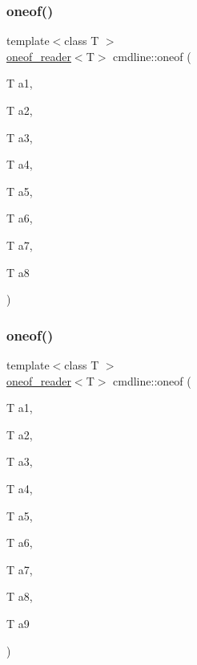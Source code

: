 \subsubsection{\texorpdfstring{oneof()}{oneof()}\hspace{0.1cm}{\footnotesize\ttfamily [8/10]}}
{\footnotesize\ttfamily template$<$class T $>$ \\
\mbox{\hyperlink{structcmdline_1_1oneof__reader}{oneof\+\_\+reader}}$<$T$>$ cmdline\+::oneof (\begin{DoxyParamCaption}\item[{T}]{a1,  }\item[{T}]{a2,  }\item[{T}]{a3,  }\item[{T}]{a4,  }\item[{T}]{a5,  }\item[{T}]{a6,  }\item[{T}]{a7,  }\item[{T}]{a8 }\end{DoxyParamCaption})}

\mbox{\label{namespacecmdline_ad4667b21857606deef99cb73dc190130}} 
\subsubsection{\texorpdfstring{oneof()}{oneof()}\hspace{0.1cm}{\footnotesize\ttfamily [9/10]}}
{\footnotesize\ttfamily template$<$class T $>$ \\
\mbox{\hyperlink{structcmdline_1_1oneof__reader}{oneof\+\_\+reader}}$<$T$>$ cmdline\+::oneof (\begin{DoxyParamCaption}\item[{T}]{a1,  }\item[{T}]{a2,  }\item[{T}]{a3,  }\item[{T}]{a4,  }\item[{T}]{a5,  }\item[{T}]{a6,  }\item[{T}]{a7,  }\item[{T}]{a8,  }\item[{T}]{a9 }\end{DoxyParamCaption})}

\mbox{\label{namespacecmdline_a65cb207a728dad2d786fd4bd97232c11}} 
